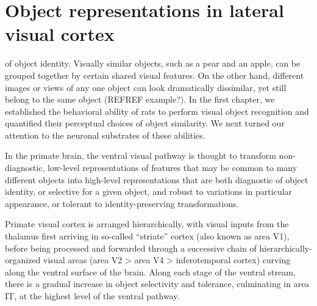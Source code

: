 
\chapter{Object representations in lateral visual cortex}
 of object identity. Visually similar objects, such as a pear and an apple, can be grouped together by certain shared visual features. On the other hand, different images or views of any one object can look dramatically dissimilar, yet still belong to the same object (REFREF example?). In the first chapter, we established the behavioral ability of rats to perform visual object recognition and quantified their perceptual choices of object similarity. We next turned our attention to the neuronal substrates of these abilities. 

In the primate brain, the ventral visual pathway is thought to transform non-diagnostic, low-level representations of features that may be common to many different objects into high-level representations that are both diagnostic of object identity, or selective for a given object, and robust to variations in particular appearance, or tolerant to identity-preserving transformations. 

Primate visual cortex is arranged hierarchically, with visual inputs from the thalamus first arriving in so-called ``striate'' cortex (also known as area V1), before being processed and forwarded through a successive chain of hierarchically-organized visual areas (area V2 > area V4 > inferotemporal cortex) curving along the ventral surface of the brain. Along each stage of the ventral stream, there is a gradual increase in object selectivity and tolerance, culminating in area IT, at the highest level of the ventral pathway. 

